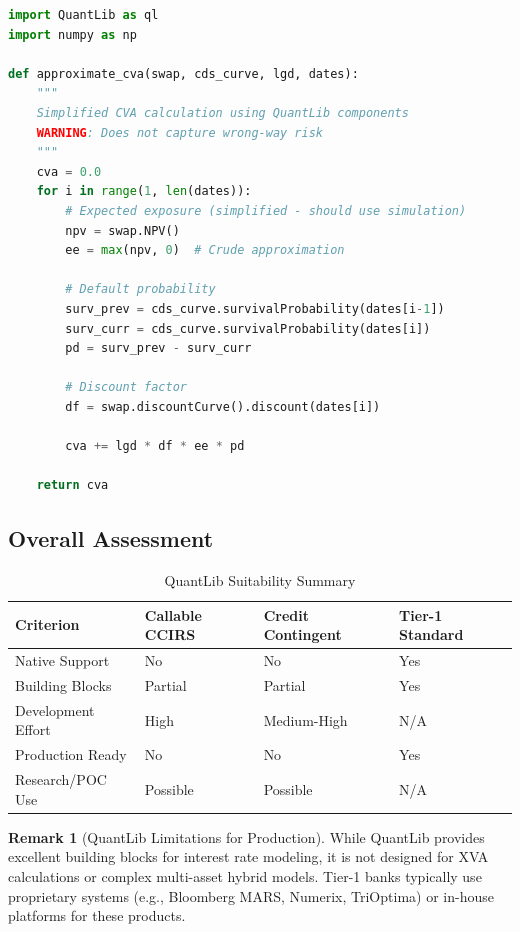 \documentclass[conference]{IEEEtran}
\theoremstyle{definition}
\newtheorem{remark}{Remark}[section]
\begin{document}
\begin{lstlisting}[language=Python, caption=CVA Approximation with QuantLib]
import QuantLib as ql
import numpy as np

def approximate_cva(swap, cds_curve, lgd, dates):
    """
    Simplified CVA calculation using QuantLib components
    WARNING: Does not capture wrong-way risk
    """
    cva = 0.0
    for i in range(1, len(dates)):
        # Expected exposure (simplified - should use simulation)
        npv = swap.NPV()
        ee = max(npv, 0)  # Crude approximation

        # Default probability
        surv_prev = cds_curve.survivalProbability(dates[i-1])
        surv_curr = cds_curve.survivalProbability(dates[i])
        pd = surv_prev - surv_curr

        # Discount factor
        df = swap.discountCurve().discount(dates[i])

        cva += lgd * df * ee * pd

    return cva
\end{lstlisting}

\subsection{Overall Assessment}

\begin{table}[ht]
\centering
\caption{QuantLib Suitability Summary}
\label{tab:ql_summary}
\begin{tabularx}{\columnwidth}{l>{\centering\arraybackslash}X>{\centering\arraybackslash}X>{\centering\arraybackslash}X}
\toprule
\textbf{Criterion} & \textbf{Callable CCIRS} & \textbf{Credit Contingent} & \textbf{Tier-1 Standard} \\
\midrule
Native Support & No & No & Yes \\
Building Blocks & Partial & Partial & Yes \\
Development Effort & High & Medium-High & N/A \\
Production Ready & No & No & Yes \\
Research/POC Use & Possible & Possible & N/A \\
\bottomrule
\end{tabularx}
\end{table}

\begin{remark}[QuantLib Limitations for Production]
While QuantLib provides excellent building blocks for interest rate modeling, it is not designed for XVA calculations or complex multi-asset hybrid models. Tier-1 banks typically use proprietary systems (e.g., Bloomberg MARS, Numerix, TriOptima) or in-house platforms for these products.
\end{remark}
\end{document}
